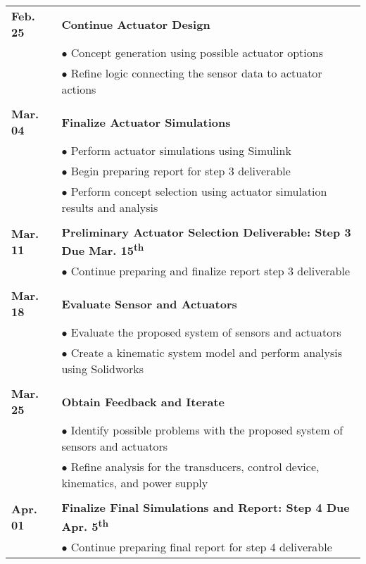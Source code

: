 \documentclass[12pt]{article}
\newcommand{\ts}{\textsuperscript}
\begin{document}
\begin{flushleft}
\begin{tabular}{l | l}
\textbf{Feb. 25} & \textbf{Continue Actuator Design}\\
 & $\bullet$ Concept generation using possible actuator options\\
  & $\bullet$ Refine logic connecting the sensor data to actuator actions\\\\
  
\textbf{Mar. 04} & \textbf{Finalize Actuator Simulations}\\
 & $\bullet$ Perform actuator simulations using Simulink\\
 & $\bullet$ Begin preparing report for step 3 deliverable\\
 & $\bullet$ Perform concept selection using actuator simulation results and analysis\\\\
 
\textbf{Mar. 11} &\textbf{Preliminary Actuator Selection Deliverable: Step 3 Due Mar. 15\ts{th}}\\
 & $\bullet$ Continue preparing and finalize report step 3 deliverable\\\\
 
\textbf{Mar. 18} & \textbf{Evaluate Sensor and Actuators}\\
 & $\bullet$ Evaluate the proposed system of sensors and actuators\\
  & $\bullet$ Create a kinematic system model and perform analysis using Solidworks\\\\
  
\textbf{Mar. 25} & \textbf{Obtain Feedback and Iterate}\\
  & $\bullet$ Identify possible problems with the proposed system of sensors and actuators\\
  & $\bullet$ Refine analysis for the transducers, control device, kinematics, and power supply\\\\
  
\textbf{Apr. 01} & \textbf{Finalize Final Simulations and Report: Step 4 Due Apr. 5\ts{th}}\\
 & $\bullet$ Continue preparing final report for step 4 deliverable\\

\end{tabular}
\end{flushleft}
\end{document}
